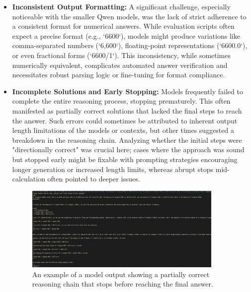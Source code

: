 \documentclass[11pt]{article}
\begin{document}
\begin{itemize}
    \item \textbf{Inconsistent Output Formatting:} A significant challenge, especially noticeable with the smaller Qwen models, was the lack of strict adherence to a consistent format for numerical answers. While evaluation scripts often expect a precise format (e.g., `6600`), models might produce variations like comma-separated numbers (`6,600`), floating-point representations (`6600.0`), or even fractional forms (`6600/1`). This inconsistency, while sometimes numerically equivalent, complicates automated answer verification and necessitates robust parsing logic or fine-tuning for format compliance.


    \item \textbf{Incomplete Solutions and Early Stopping:} Models frequently failed to complete the entire reasoning process, stopping prematurely. This often manifested as partially correct solutions that lacked the final steps to reach the answer. Such errors could sometimes be attributed to inherent output length limitations of the models or contexts, but other times suggested a breakdown in the reasoning chain. Analyzing whether the initial steps were "directionally correct" was crucial here; cases where the approach was sound but stopped early might be fixable with prompting strategies encouraging longer generation or increased length limits, whereas abrupt stops mid-calculation often pointed to deeper issues.

    \begin{figure}[h!]
        \centering
        \includegraphics[width=0.9\textwidth]{incomplete.png} %
        \caption{An example of a model output showing a partially correct reasoning chain that stops before reaching the final answer.}
        \label{fig:incomplete_sol}
    \end{figure}


\end{itemize}
\end{document}
